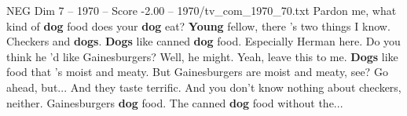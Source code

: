 \begin{textsample}{NEG Dim 7 – 1970 – Score -2.00 – 1970/tv\_com\_1970\_70.txt}  \label{ex:f7_neg_059}
Pardon me, what kind of \textbf{dog} food does your \textbf{dog} eat? \textbf{Young} fellow, there 's two things I know.
Checkers and \textbf{dogs}. \textbf{Dogs} like canned \textbf{dog} food.
Especially Herman here.
Do you think he 'd like Gainesburgers?
Well, he might.
Yeah, leave this to me. \textbf{Dogs} like food that 's moist and meaty.
But Gainesburgers are moist and meaty, see?
Go ahead, but...
And they taste terrific.
And you don't know nothing about checkers, neither.
Gainesburgers \textbf{dog} food.
The canned \textbf{dog} food without the...

\end{textsample}
